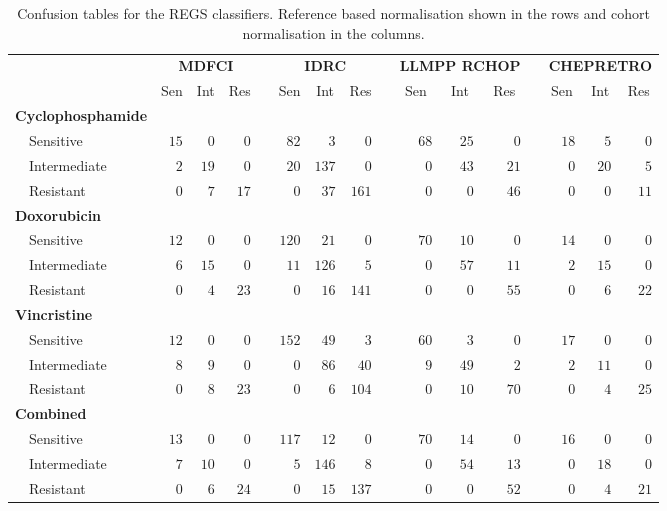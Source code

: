 \documentclass{article}
\begin{document}
\begin{table}[!tbp]
\small
\caption{Confusion tables for the REGS classifiers.
Reference based normalisation shown in the rows and cohort normalisation in the columns.\label{tab:confusiondrugreference}}
\begin{center}
\begin{tabular}{lrrrcrrrcrrrcrrr}
\hline\hline
\multicolumn{1}{l}{\bfseries  }&\multicolumn{3}{c}{\bfseries MDFCI}&\multicolumn{1}{c}{\bfseries }&\multicolumn{3}{c}{\bfseries IDRC}&\multicolumn{1}{c}{\bfseries }&\multicolumn{3}{c}{\bfseries LLMPP RCHOP}&\multicolumn{1}{c}{\bfseries }&\multicolumn{3}{c}{\bfseries CHEPRETRO}\tabularnewline
\cline{2-4} \cline{6-8} \cline{10-12} \cline{14-16}
\multicolumn{1}{l}{}&\multicolumn{1}{c}{Sen}&\multicolumn{1}{c}{Int}&\multicolumn{1}{c}{Res}&\multicolumn{1}{c}{}&\multicolumn{1}{c}{Sen}&\multicolumn{1}{c}{Int}&\multicolumn{1}{c}{Res}&\multicolumn{1}{c}{}&\multicolumn{1}{c}{Sen}&\multicolumn{1}{c}{Int}&\multicolumn{1}{c}{Res}&\multicolumn{1}{c}{}&\multicolumn{1}{c}{Sen}&\multicolumn{1}{c}{Int}&\multicolumn{1}{c}{Res}\tabularnewline
\hline
{\bfseries Cyclophosphamide}&&&&&&&&&&&&&&&\tabularnewline
~~Sensitive&$15$&$ 0$&$ 0$&&$ 82$&$  3$&$  0$&&$68$&$25$&$ 0$&&$18$&$ 5$&$ 0$\tabularnewline
~~Intermediate&$ 2$&$19$&$ 0$&&$ 20$&$137$&$  0$&&$ 0$&$43$&$21$&&$ 0$&$20$&$ 5$\tabularnewline
~~Resistant&$ 0$&$ 7$&$17$&&$  0$&$ 37$&$161$&&$ 0$&$ 0$&$46$&&$ 0$&$ 0$&$11$\tabularnewline
\hline
{\bfseries Doxorubicin}&&&&&&&&&&&&&&&\tabularnewline
~~Sensitive&$12$&$ 0$&$ 0$&&$120$&$ 21$&$  0$&&$70$&$10$&$ 0$&&$14$&$ 0$&$ 0$\tabularnewline
~~Intermediate&$ 6$&$15$&$ 0$&&$ 11$&$126$&$  5$&&$ 0$&$57$&$11$&&$ 2$&$15$&$ 0$\tabularnewline
~~Resistant&$ 0$&$ 4$&$23$&&$  0$&$ 16$&$141$&&$ 0$&$ 0$&$55$&&$ 0$&$ 6$&$22$\tabularnewline
\hline
{\bfseries Vincristine}&&&&&&&&&&&&&&&\tabularnewline
~~Sensitive&$12$&$ 0$&$ 0$&&$152$&$ 49$&$  3$&&$60$&$ 3$&$ 0$&&$17$&$ 0$&$ 0$\tabularnewline
~~Intermediate&$ 8$&$ 9$&$ 0$&&$  0$&$ 86$&$ 40$&&$ 9$&$49$&$ 2$&&$ 2$&$11$&$ 0$\tabularnewline
~~Resistant&$ 0$&$ 8$&$23$&&$  0$&$  6$&$104$&&$ 0$&$10$&$70$&&$ 0$&$ 4$&$25$\tabularnewline
\hline
{\bfseries Combined}&&&&&&&&&&&&&&&\tabularnewline
~~Sensitive&$13$&$ 0$&$ 0$&&$117$&$ 12$&$  0$&&$70$&$14$&$ 0$&&$16$&$ 0$&$ 0$\tabularnewline
~~Intermediate&$ 7$&$10$&$ 0$&&$  5$&$146$&$  8$&&$ 0$&$54$&$13$&&$ 0$&$18$&$ 0$\tabularnewline
~~Resistant&$ 0$&$ 6$&$24$&&$  0$&$ 15$&$137$&&$ 0$&$ 0$&$52$&&$ 0$&$ 4$&$21$\tabularnewline
\hline
\end{tabular}
\end{center}
\end{table}


\listoftodos
\end{document}
